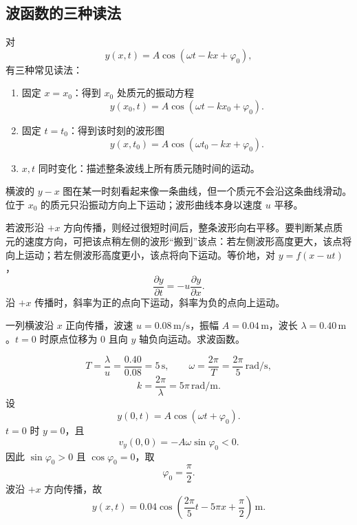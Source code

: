 
\subsection*{波函数的三种读法}

对
\[
  y(x,t)=A\cos(\omega t-kx+\varphi_0),
\]
有三种常见读法：
\begin{enumerate}
  \item 固定 $x=x_0$：得到 $x_0$ 处质元的振动方程
  \[
    y(x_0,t)=A\cos(\omega t-kx_0+\varphi_0).
  \]
  \item 固定 $t=t_0$：得到该时刻的波形图
  \[
    y(x,t_0)=A\cos(\omega t_0-kx+\varphi_0).
  \]
  \item $x,t$ 同时变化：描述整条波线上所有质元随时间的运动。
\end{enumerate}

\begin{pitfall}[波形图不是质元运动轨迹]
横波的 $y-x$ 图在某一时刻看起来像一条曲线，但一个质元不会沿这条曲线滑动。位于 $x_0$ 的质元只沿振动方向上下运动；波形曲线本身以速度 $u$ 平移。
\end{pitfall}

\begin{method}[由波形图判断质元瞬时运动方向]
若波形沿 $+x$ 方向传播，则经过很短时间后，整条波形向右平移。要判断某点质元的速度方向，可把该点稍左侧的波形“搬到”该点：若左侧波形高度更大，该点将向上运动；若左侧波形高度更小，该点将向下运动。等价地，对 $y=f(x-ut)$，
\[
  \frac{\partial y}{\partial t}=-u\frac{\partial y}{\partial x}.
\]
沿 $+x$ 传播时，斜率为正的点向下运动，斜率为负的点向上运动。
\end{method}

\begin{example}[title={由波形信息写波函数}]\label{eg:wavefunction-example}
一列横波沿 $x$ 正向传播，波速 $u=0.08\,\mathrm{m/s}$，振幅 $A=0.04\,\mathrm{m}$，波长 $\lambda=0.40\,\mathrm{m}$。$t=0$ 时原点位移为 $0$ 且向 $y$ 轴负向运动。求波函数。

\begin{solution}
\[
  T=\frac{\lambda}{u}=\frac{0.40}{0.08}=5\,\mathrm{s},\qquad
  \omega=\frac{2\pi}{T}=\frac{2\pi}{5}\,\mathrm{rad/s},
\]
\[
  k=\frac{2\pi}{\lambda}=5\pi\,\mathrm{rad/m}.
\]
设
\[
  y(0,t)=A\cos(\omega t+\varphi_0).
\]
$t=0$ 时 $y=0$，且
\[
  v_y(0,0)=-A\omega\sin\varphi_0<0.
\]
因此 $\sin\varphi_0>0$ 且 $\cos\varphi_0=0$，取
\[
  \varphi_0=\frac{\pi}{2}.
\]
波沿 $+x$ 方向传播，故
\[
  y(x,t)=0.04\cos\left(\frac{2\pi}{5}t-5\pi x+\frac{\pi}{2}\right)\,\mathrm{m}.
\]
\end{solution}
\end{example}


